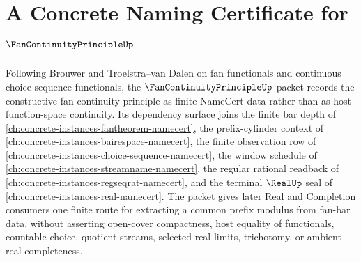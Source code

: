 \chapter{A Concrete Naming Certificate for $\FanContinuityPrincipleUp$}
\label{ch:concrete-instances-fan-continuity-principle-namecert}

Following Brouwer and Troelstra--van Dalen on fan functionals and continuous choice-sequence functionals, the $\FanContinuityPrincipleUp$ packet records the constructive fan-continuity principle as finite NameCert data rather than as host function-space continuity. Its dependency surface joins the finite bar depth of \autoref{ch:concrete-instances-fantheorem-namecert}, the prefix-cylinder context of \autoref{ch:concrete-instances-bairespace-namecert}, the finite observation row of \autoref{ch:concrete-instances-choice-sequence-namecert}, the window schedule of \autoref{ch:concrete-instances-streamname-namecert}, the regular rational readback of \autoref{ch:concrete-instances-regseqrat-namecert}, and the terminal $\RealUp$ seal of \autoref{ch:concrete-instances-real-namecert}. The packet gives later Real and Completion consumers one finite route for extracting a common prefix modulus from fan-bar data, without asserting open-cover compactness, host equality of functionals, countable choice, quotient streams, selected real limits, trichotomy, or ambient real completeness.


